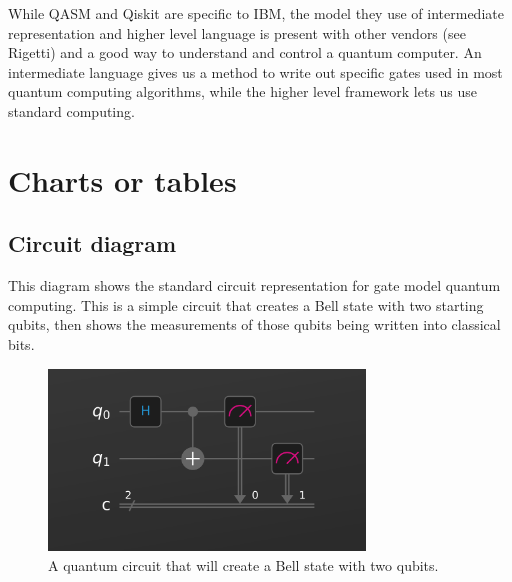 \documentclass{article}
\begin{document}
While QASM and Qiskit are specific to IBM, the model they use of intermediate representation and higher level language is present with other vendors (see Rigetti) and a good way to understand and control a quantum computer. An intermediate language gives us a method to write out specific gates used in most quantum computing algorithms, while the higher level framework lets us use standard computing. 



\section{Charts or tables}
\subsection{Circuit diagram}
This diagram shows the standard circuit representation for gate model quantum computing. This is a simple circuit that creates a Bell state with two starting qubits, then shows the measurements of those qubits being written into classical bits.
\begin{figure}[H]
    \centering
    \includegraphics[width=0.75\textwidth]{circuit.png}
    \caption{A quantum circuit that will create a Bell state with two qubits.}
\end{figure}
\end{document}
